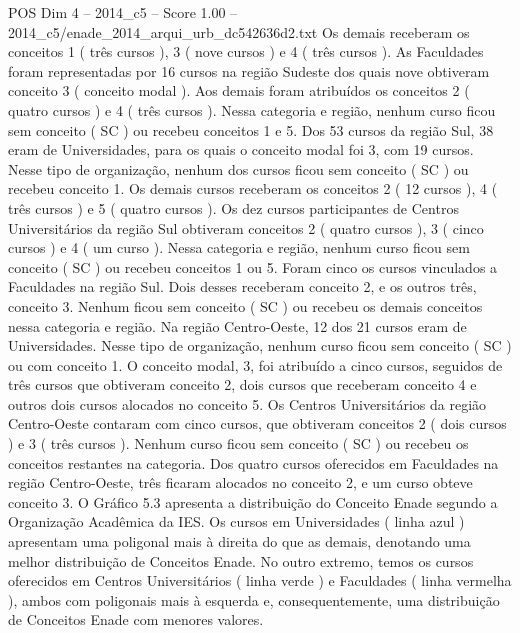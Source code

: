 \begin{textsample}{POS Dim 4 – 2014\_c5 – Score 1.00 – 2014\_c5/enade\_2014\_arqui\_urb\_dc542636d2.txt}
Os demais receberam os conceitos 1 ( três cursos ), 3 ( nove cursos ) e 4 ( três cursos ).
As Faculdades foram representadas por 16 cursos na região Sudeste dos quais nove obtiveram conceito 3 ( conceito modal ).
Aos demais foram atribuídos os conceitos 2 ( quatro cursos ) e 4 ( três cursos ).
Nessa categoria e região, nenhum curso ficou sem conceito ( SC ) ou recebeu conceitos 1 e 5.
Dos 53 cursos da região Sul, 38 eram de Universidades, para os quais o conceito modal foi 3, com 19 cursos.
Nesse tipo de organização, nenhum dos cursos ficou sem conceito ( SC ) ou recebeu conceito 1.
Os demais cursos receberam os conceitos 2 ( 12 cursos ), 4 ( três cursos ) e 5 ( quatro cursos ).
Os dez cursos participantes de Centros Universitários da região Sul obtiveram conceitos 2 ( quatro cursos ), 3 ( cinco cursos ) e 4 ( um curso ).
Nessa categoria e região, nenhum curso ficou sem conceito ( SC ) ou recebeu conceitos 1 ou 5.
Foram cinco os cursos vinculados a Faculdades na região Sul.
Dois desses receberam conceito 2, e os outros três, conceito 3.
Nenhum ficou sem conceito ( SC ) ou recebeu os demais conceitos nessa categoria e região.
Na região Centro-Oeste, 12 dos 21 cursos eram de Universidades.
Nesse tipo de organização, nenhum curso ficou sem conceito ( SC ) ou com conceito 1.
O conceito modal, 3, foi atribuído a cinco cursos, seguidos de três cursos que obtiveram conceito 2, dois cursos que receberam conceito 4 e outros dois cursos alocados no conceito 5.
Os Centros Universitários da região Centro-Oeste contaram com cinco cursos, que obtiveram conceitos 2 ( dois cursos ) e 3 ( três cursos ).
Nenhum curso ficou sem conceito ( SC ) ou recebeu os conceitos restantes na categoria.
Dos quatro cursos oferecidos em Faculdades na região Centro-Oeste, três ficaram alocados no conceito 2, e um curso obteve conceito 3.
O Gráfico 5.3 apresenta a distribuição do Conceito Enade segundo a Organização Acadêmica da IES.
Os cursos em Universidades ( linha azul ) apresentam uma poligonal mais à direita do que as demais, denotando uma melhor distribuição de Conceitos Enade.
No outro extremo, temos os cursos oferecidos em Centros Universitários ( linha verde ) e Faculdades ( linha vermelha ), ambos com poligonais mais à esquerda e, consequentemente, uma distribuição de Conceitos Enade com menores valores.

\end{textsample}
